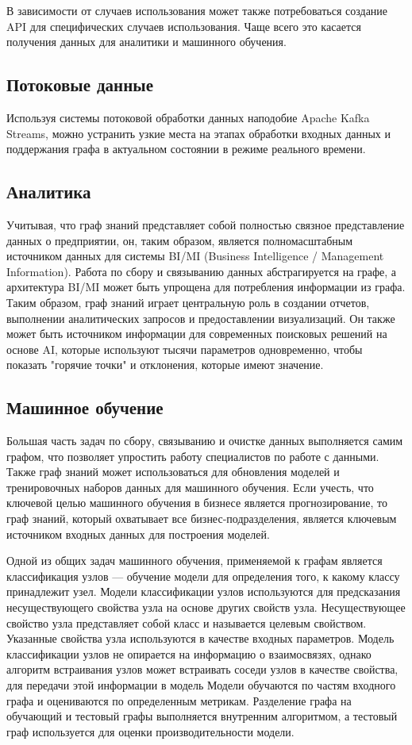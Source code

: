 В зависимости от случаев использования может также потребоваться создание API для специфических случаев использования. Чаще всего это касается
получения данных для аналитики и машинного обучения.

\subsection{Потоковые данные}

Используя системы потоковой обработки данных наподобие Apache Kafka Streams, можно устранить узкие места на этапах обработки входных данных
и поддержания графа в актуальном состоянии в режиме реального времени.

\subsection{Аналитика}

Учитывая, что граф знаний представляет собой полностью связное представление данных о предприятии, он, таким образом, является полномасштабным
источником данных для системы BI/MI (Business Intelligence / Management Information). Работа по сбору и связыванию данных абстрагируется на
графе, а архитектура BI/MI может быть упрощена для потребления информации из графа. Таким образом, граф знаний играет центральную роль в
создании отчетов, выполнении аналитических запросов и предоставлении визуализаций. Он также может быть источником информации для современных
поисковых решений на основе AI, которые используют тысячи параметров одновременно, чтобы показать "горячие точки" и отклонения, которые имеют значение.

\subsection{Машинное обучение}

Большая часть задач по сбору, связыванию и очистке данных выполняется самим графом, что позволяет упростить работу специалистов по работе с
данными. Также граф знаний может использоваться для обновления моделей и тренировочных наборов данных для машинного обучения. Если учесть,
что ключевой целью машинного обучения в бизнесе является прогнозирование, то граф знаний, который охватывает все бизнес-подразделения, является
ключевым источником входных данных для построения моделей.

Одной из общих задач машинного обучения, применяемой к графам является классификация узлов — обучение модели для определения того, к какому
классу принадлежит узел. Модели классификации узлов используются для предсказания несуществующего свойства узла на основе других свойств
узла. Несуществующее свойство узла представляет собой класс и называется целевым свойством. Указанные свойства узла используются в качестве
входных параметров. Модель классификации узлов не опирается на информацию о взаимосвязях, однако алгоритм встраивания узлов может встраивать
соседи узлов в качестве свойства, для передачи этой информации в модель Модели обучаются по частям входного графа и оцениваются по
определенным метрикам. Разделение графа на обучающий и тестовый графы выполняется внутренним алгоритмом, а тестовый граф используется для
оценки производительности модели.

